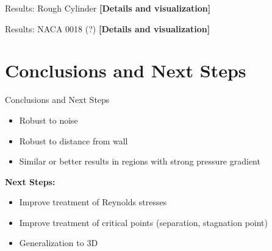 \documentclass{beamer}
\begin{document}
\begin{frame}{Results: Rough Cylinder}
    \textbf{[Details and visualization]}
\end{frame}

\begin{frame}{Results: NACA 0018 (?)}
    \textbf{[Details and visualization]}
\end{frame}

\section{Conclusions and Next Steps}
\begin{frame}{Conclusions and Next Steps}
    \begin{itemize}
        \item Robust to noise
        \item Robust to distance from wall
        \item Similar or better results in regions with strong pressure gradient
    \end{itemize}
    \textbf{Next Steps:}
    \begin{itemize}
        \item Improve treatment of Reynolds stresses
        \item Improve treatment of critical points (separation, stagnation point)
        \item Generalization to 3D
    \end{itemize}
\end{frame}
\end{document}
